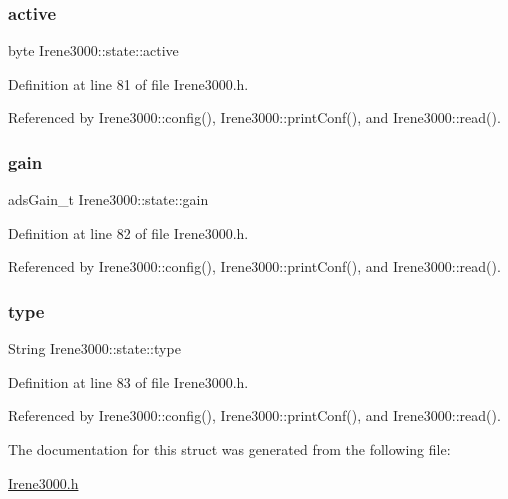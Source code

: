 \subsubsection{\texorpdfstring{active}{active}}
{\footnotesize\ttfamily byte Irene3000\+::state\+::active}



Definition at line 81 of file Irene3000.\+h.



Referenced by Irene3000\+::config(), Irene3000\+::print\+Conf(), and Irene3000\+::read().

\mbox{\label{structIrene3000_1_1state_a1ecf69d38cb31ecaf6b3602a3f3e93cb}} 
\subsubsection{\texorpdfstring{gain}{gain}}
{\footnotesize\ttfamily ads\+Gain\+\_\+t Irene3000\+::state\+::gain}



Definition at line 82 of file Irene3000.\+h.



Referenced by Irene3000\+::config(), Irene3000\+::print\+Conf(), and Irene3000\+::read().

\mbox{\label{structIrene3000_1_1state_a9897a7e02727db6351d44006eec73799}} 
\subsubsection{\texorpdfstring{type}{type}}
{\footnotesize\ttfamily String Irene3000\+::state\+::type}



Definition at line 83 of file Irene3000.\+h.



Referenced by Irene3000\+::config(), Irene3000\+::print\+Conf(), and Irene3000\+::read().



The documentation for this struct was generated from the following file\+:\begin{DoxyCompactItemize}
\item 
\hyperlink{Irene3000_8h}{Irene3000.\+h}\end{DoxyCompactItemize}
